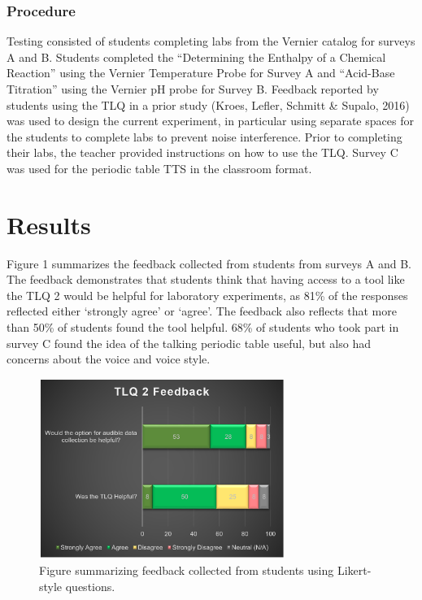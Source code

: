 \documentclass[11.5pt]{sig-alternate}
\begin{document}
\begin{large}
\subsubsection*{Procedure}
Testing consisted of students completing labs from the Vernier catalog for surveys A and B.  Students completed the “Determining the Enthalpy of a Chemical Reaction” using the Vernier Temperature Probe for Survey A and “Acid-Base Titration” using the Vernier pH probe for Survey B.  Feedback reported by students using the TLQ in a prior study (Kroes, Lefler, Schmitt \& Supalo, 2016) was used to design the current experiment, in particular using separate spaces for the students to complete labs to prevent noise interference.  Prior to completing their labs, the teacher provided instructions on how to use the TLQ.   Survey C was used for the periodic table TTS in the classroom format. 

\section*{Results}
Figure 1 summarizes the feedback collected from students from surveys A and B.  The feedback demonstrates that students think that having access to a tool like the TLQ 2 would be helpful for laboratory experiments, as 81\% of the responses reflected either ‘strongly agree’ or ‘agree’.  The feedback also reflects that more than 50\% of students found the tool helpful.  68\% of students who took part in survey C found the idea of the talking periodic table useful, but also had concerns about the voice and voice style.

\begin{figure}[htp]
    \centering
    \includegraphics[width=8cm]{figure1.png}
 \caption{Figure summarizing feedback collected from
students using Likert-style questions.}
    \label{Figure summarizing feedback collected from
students using Likert-style questions.}
\end{figure}


\end{large}
\end{document}
